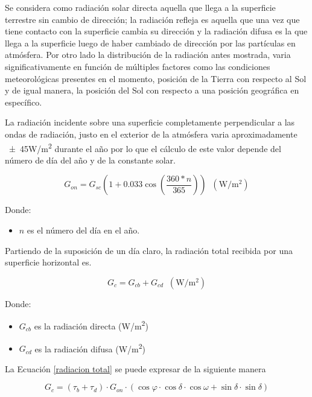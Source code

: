 Se considera como radiación solar directa aquella que llega a la superficie terrestre sin cambio de dirección; la radiación refleja es aquella que una vez que tiene contacto con la superficie cambia su dirección y la radiación difusa es la que llega a la superficie luego de haber cambiado de dirección por las partículas en atmósfera. Por otro lado la distribución de la radiación antes mostrada, varia significativamente en función de múltiples factores como las condiciones meteorológicas presentes en el momento, posición de la Tierra con respecto al Sol y de igual manera, la posición del Sol con respecto a una posición geográfica en específico.\cite{solar}

La radiación incidente sobre una superficie completamente perpendicular a las ondas de radiación, justo en el exterior de la atmósfera varia aproximadamente \num{\pm45}\si{\watt/\square\meter} durante el año por lo que el cálculo de este valor depende del número de día del año y de la constante solar. \cite{solar}

\begin{equation}\label{gon}
    G_{on}=G_{sc}\left ( 1+0.033\cos \left ( \frac{360*n}{365} \right ) \right )\;\;(\si{\watt/\square\meter})
\end{equation}

Donde:

\begin{itemize}
    \item $n$ es el número del día en el año.
\end{itemize}

Partiendo de la suposición de un día claro, la radiación total recibida por una superficie horizontal es. \cite{solar}

\begin{equation}\label{radiacion total}
    G_{c}=G_{cb}+G_{cd}\;\;(\si{\watt/\square\meter})
\end{equation}

Donde:

\begin{itemize}
    \item $G_{cb}$ es la radiación directa (\si{\watt/\square\meter})
    \item $G_{cd}$ es la radiación difusa (\si{\watt/\square\meter})
\end{itemize}

La Ecuación \ref{radiacion total} se puede expresar de la siguiente manera

\begin{equation}\label{gc}
    G_{c}=(\tau _{b}+\tau _{d})\cdot G_{on}\cdot(\cos\varphi \cdot \cos\delta \cdot \cos\omega +\sin\delta \cdot \sin\delta ) 
\end{equation}

